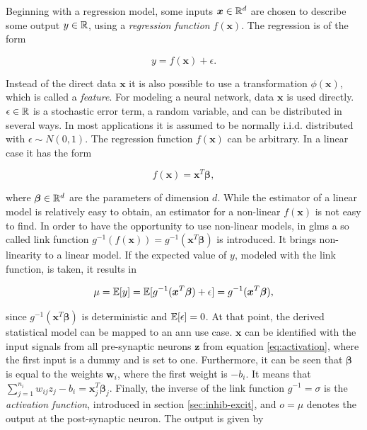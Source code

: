 Beginning with a regression model, some inputs $\bm x \in \mathbb{R}^d$ are chosen to describe some output $y \in \mathbb{R}$, using a \emph{regression function} $f(\bm x)$. The regression is of the form

\begin{equation}
y = f(\bm x) + \epsilon.
\label{eq:gen-reg}
\end{equation}

Instead of the direct data $\bm x$ it is also possible to use a transformation $\phi(\bm x)$, which is called a \emph{feature}. For modeling a neural network, data $\bm x$ is used directly. $\epsilon \in \mathbb{R}$ is a stochastic error term, a random variable, and can be distributed in several ways. In most applications it is assumed to be normally i.i.d. distributed with $\epsilon \sim N(0,1)$. The regression function $f(\bm x)$ can be arbitrary. In a linear case it has the form

\begin{equation}
f(\bm x) = \bm x^T \bm \beta,
\end{equation}

where $\bm \beta \in \mathbb{R}^d$ are the parameters of dimension $d$. While the estimator of a linear model is relatively easy to obtain, an estimator for a non-linear $f(\bm x)$ is not easy to find. In order to have the opportunity to use non-linear models, in \ac{glm}s a so called link function $g^{-1}(f(\bm x)) = g^{-1}(\bm x^T \bm \beta)$ is introduced. It brings non-linearity to a linear model. If the expected value of $y$, modeled with the link function, is taken, it results in

\begin{equation}
\mu = \mathbb{E}[y] = \mathbb{E}[g^{-1}(\bm x^T \bm \beta) + \epsilon] = g^{-1}(\bm x^T \bm \beta),
\end{equation}

since $g^{-1}(\bm x^T \bm \beta)$ is deterministic and $\mathbb{E}[\epsilon] = 0$. At that point, the derived statistical model can be mapped to an \acs{ann} use case. $\bm x$ can be identified with the input signals from all pre-synaptic neurons $\bm z$ from equation \eqref{eq:activation}, where the first input is a dummy and is set to one. Furthermore, it can be seen that $\bm\beta$ is equal to the weights $\bm w_i$, where the first weight is $-b_i$. It means that $\sum_{j=1}^{n_i} w_{ij} z_j - b_i = \bm x_j^T \bm\beta_j$. Finally, the inverse of the link function $g^{-1} = \sigma$ is the \emph{activation function}, introduced in section \ref{sec:inhib-excit}, and $o = \mu$ denotes the output at the post-synaptic neuron. The output is given by

